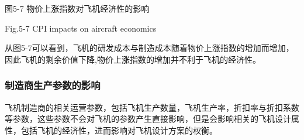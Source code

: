 \documentclass[12pt]{article}
\begin{document}
\begin{Center}
图5-7 物价上涨指数对飞机经济性的影响
\end{Center}\par

\begin{Center}
Fig.5-7 CPI impacts on aircraft economics
\end{Center}\par


\vspace{\baselineskip}
从图5-7可以看到，飞机的研发成本与制造成本随着物价上涨指数的增加而增加，因此飞机的剩余价值下降,物价上涨指数的增加并不利于飞机的经济性。\par

\subsubsection*{制造商生产参数的影响}
飞机制造商的相关运营参数，包括飞机生产数量，飞机生产率，折扣率与折扣系数等参数，这些参数不会对飞机的参数产生直接影响，但是会影响相关的飞机设计属性，包括飞机的经济性，进而影响对飞机设计方案的权衡。\par
\end{document}
